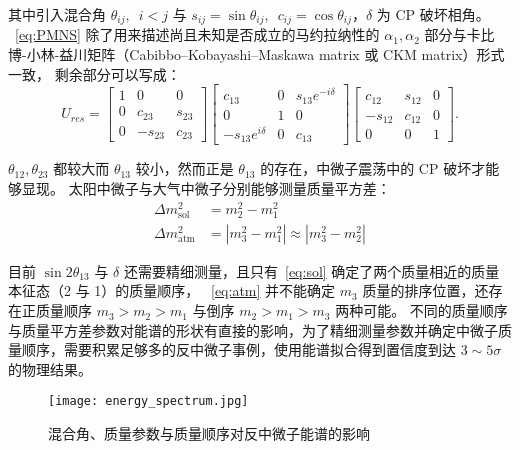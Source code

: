 其中引入混合角 $\theta_{ij},\enspace i<j$ 与 $s_{ij}=\sin{\theta_{ij}},\enspace c_{ij}=\cos{\theta_{ij}}$，$\delta$ 为 CP 破坏相角。
~\eqref{eq:PMNS} 除了用来描述尚且未知是否成立的马约拉纳性的 $\alpha_1,\alpha_2$ 部分与卡比博-小林-益川矩阵（Cabibbo–Kobayashi–Maskawa matrix 或 CKM matrix）形式一致，
剩余部分可以写成：
\begin{equation}
    U_{res}=
    \begin{bmatrix}
    1&0&0\\0&c_{23}&s_{23}\\0&-s_{23}&c_{23}
    \end{bmatrix}
    \begin{bmatrix}
    c_{13}&0&s_{13}e^{-i\delta}\\0&1&0\\-s_{13}e^{i\delta}&0&c_{13}
    \end{bmatrix}
    \begin{bmatrix}
    c_{12}&s_{12}&0\\-s_{12}&c_{12}&0\\0&0&1
    \end{bmatrix}.
\end{equation}

$\theta_{12},\theta_{23}$ 都较大而 $\theta_{13}$ 较小，然而正是 $\theta_{13}$ 的存在，中微子震荡中的 CP 破坏才能够显现。
太阳中微子与大气中微子分别能够测量质量平方差：
\begin{align}
    \Delta m_{\text{sol}}^2&=m_2^2-m_1^2\label{eq:sol}\\
    \Delta m_{\text{atm}}^2&=\left|m_3^2-m_1^2\right|\approx\left|m_3^2-m_2^2\right|\label{eq:atm}
\end{align}

目前 $\sin{2\theta_{13}}$ 与 $\delta$ 还需要精细测量，且只有~\eqref{eq:sol} 确定了两个质量相近的质量本征态（2 与 1）的质量顺序，
~\eqref{eq:atm} 并不能确定 $m_3$ 质量的排序位置，还存在正质量顺序 $m_3>m_2>m_1$ 与倒序 $m_2>m_1>m_3$ 两种可能。
不同的质量顺序与质量平方差参数对能谱的形状有直接的影响，为了精细测量参数并确定中微子质量顺序，需要积累足够多的反中微子事例，使用能谱拟合得到置信度到达 $3\sim5\sigma$ 的物理结果。

\begin{figure}
    \centering
    \texttt{[image: energy\_spectrum.jpg]}
    \caption{混合角、质量参数与质量顺序对反中微子能谱的影响\cite{JUNOPhysicsDetector2022}}
\end{figure}

